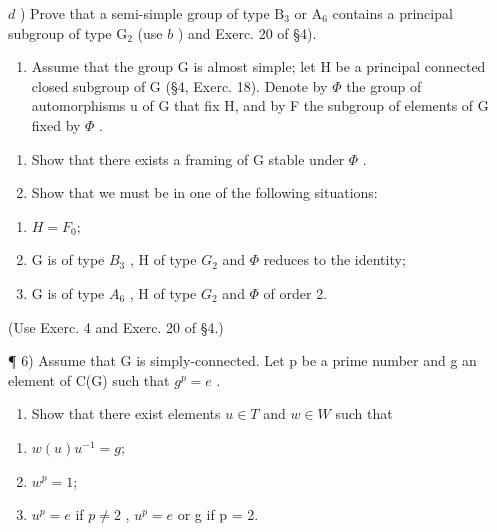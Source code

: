 \begin{enumerate}
\(d\) ) Prove that a semi-simple group of type \(\mathrm{B}_3\) or \(\mathrm{A}_6\) contains a principal subgroup of type \(\mathrm{G}_2\) (use \(b\) ) and Exerc. 20 of §4).

\begin{enumerate}
\def\labelenumi{\arabic{enumi})}
\setcounter{enumi}{4}
\tightlist
\item
  Assume that the group G is almost simple; let H be a principal connected closed subgroup of G (§4, Exerc. 18). Denote by \(\Phi\) the group of automorphisms u of G that fix H, and by F the subgroup of elements of G fixed by \(\Phi\) .
\end{enumerate}

\begin{enumerate}
\def\labelenumi{\alph{enumi})}
\item
  Show that there exists a framing of \(\mathrm{G}\) stable under \(\varPhi\) .
\item
  Show that we must be in one of the following situations:
\end{enumerate}

\begin{enumerate}
\def\labelenumi{(\roman{enumi})}
\item
  \(H = F_{0};\)
\item
  G is of type \(B_{3}\) , H of type \(G_{2}\) and \(\Phi\) reduces to the identity;
\item
  G is of type \(A_{6}\) , H of type \(G_{2}\) and \(\Phi\) of order 2.
\end{enumerate}

(Use Exerc. 4 and Exerc. 20 of §4.)

¶ 6) Assume that G is simply-connected. Let p be a prime number and g an element of C(G) such that \(g^{p} = e\) .

\begin{enumerate}
\def\labelenumi{\alph{enumi})}
\tightlist
\item
  Show that there exist elements \(u \in T\) and \(w \in W\) such that
\end{enumerate}

\begin{enumerate}
\def\labelenumi{(\roman{enumi})}
\item
  \(w(u)u^{-1} = g;\)
\item
  \(w^{p} = 1;\)
\item
  \(u^{p} = e\) if \(p \neq 2\) , \(u^{p} = e\) or g if p = 2.
\end{enumerate}


\end{enumerate}
